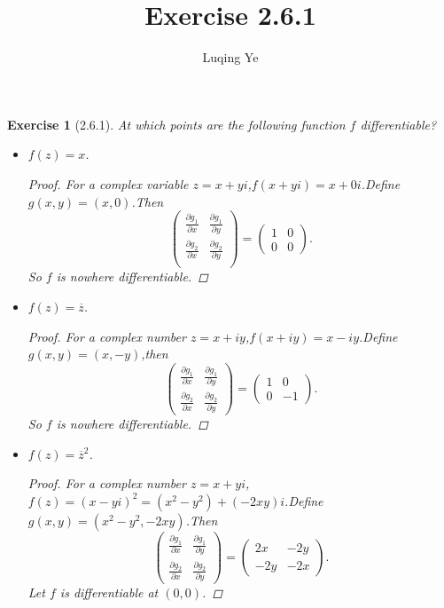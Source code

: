 \documentclass{amsart}
\theoremstyle{plain}
\newtheorem{exercise}[theorem]{Exercise}
\theoremstyle{definition}
\begin{document}
\title{Exercise 2.6.1}

\author{Luqing Ye}
\address{College of Science, Hangzhou Normal University,Hangzhou City,Zhejiang Province,China}




\maketitle

\setcounter{tocdepth}{2}
\begin{exercise}[2.6.1]
At which points are the following function $f$ differentiable?
\begin{itemize}
\item $f(z)=x$.

\begin{proof}
For a complex variable $z=x+yi$,$f(x+yi)=x+0i$.Define
$g(x,y)=(x,0)$.Then 
$$
\begin{pmatrix}
  \frac{\partial g_{1}}{\partial x}&\frac{\partial g_{1}}{\partial
    y}\\
  \frac{\partial g_{2}}{\partial x}&\frac{\partial g_2}{\partial
    y}\\
\end{pmatrix}=\begin{pmatrix}
  1&0\\
0&0
\end{pmatrix}.
$$
So $f$ is nowhere differentiable.
\end{proof}
\item $f(z)=\overline{z}$.
  \begin{proof}
    For a complex number $z=x+iy$,$f(x+iy)=x-iy$.Define
$g(x,y)=(x,-y)$,then
$$
\begin{pmatrix}
  \frac{\partial g_1}{\partial x}&\frac{\partial g_1}{\partial y}\\
\frac{\partial g_2}{\partial x}&\frac{\partial g_2}{\partial y}
\end{pmatrix}=\begin{pmatrix}
  1&0\\
0&-1
\end{pmatrix}.
$$
So $f$ is nowhere differentiable.
  \end{proof}
\item $f(z)=\overline{z}^2$.
  \begin{proof}
For a complex number $z=x+yi$,$f(z)=(x-yi)^2=(x^2-y^2)+(-2xy)i$.Define
$g(x,y)=(x^2-y^2,-2xy)$.Then 
$$
\begin{pmatrix}
  \frac{\partial g_1}{\partial x}&\frac{\partial g_1}{\partial y}\\
\frac{\partial g_2}{\partial x}&\frac{\partial g_2}{\partial y}
\end{pmatrix}=\begin{pmatrix}
  2x&-2y\\
-2y&-2x
\end{pmatrix}.
$$
Let $f$ is differentiable at $(0,0)$.
  \end{proof}
\end{itemize}
\end{exercise}
\end{document}
